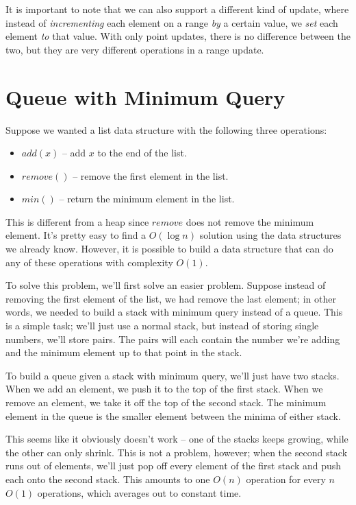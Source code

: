 It is important to note that we can also support a different kind of update, where instead of \textit{incrementing} each element on a range \textit{by} a certain value, we \textit{set} each element \textit{to} that value. With only point updates, there is no difference between the two, but they are very different operations in a range update.

\section{Queue with Minimum Query}

Suppose we wanted a list data structure with the following three operations:

\begin{itemize}

\item
$add(x)$ -- add $x$ to the end of the list.

\item
$remove()$ -- remove the first element in the list.

\item
$min()$ -- return the minimum element in the list.

\end{itemize}

This is different from a heap since $remove$ does not remove the minimum element. It's pretty easy to find a $O(\log{n})$ solution using the data structures we already know. However, it is possible to build a data structure that can do any of these operations with complexity $O(1)$.

To solve this problem, we'll first solve an easier problem. Suppose instead of removing the first element of the list, we had remove the last element; in other words, we needed to build a stack with minimum query instead of a queue. This is a simple task; we'll just use a normal stack, but instead of storing single numbers, we'll store pairs. The pairs will each contain the number we're adding and the minimum element up to that point in the stack.

To build a queue given a stack with minimum query, we'll just have two stacks. When we add an element, we push it to the top of the first stack. When we remove an element, we take it off the top of the second stack. The minimum element in the queue is the smaller element between the minima of either stack.

This seems like it obviously doesn't work -- one of the stacks keeps growing, while the other can only shrink. This is not a problem, however; when the second stack runs out of elements, we'll just pop off every element of the first stack and push each onto the second stack. This amounts to one $O(n)$ operation for every $n$ $O(1)$ operations, which averages out to constant time.

